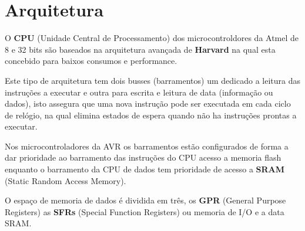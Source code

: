 \documentclass[titlepage, a4paper, 10pt, reqno, openany]{report}
\begin{document}
\section{Arquitetura}
O {\bf CPU} (Unidade Central de Processamento) dos microcontroldores da Atmel de 8 e 32 bits s\~{a}o baseados na arquitetura avan\c{c}ada de {\bf Harvard} na qual esta concebido para baixos consumos e performance. \par
Este tipo de arquitetura tem dois  busses (barramentos) um dedicado a leitura das instruções a executar e outra para escrita e leitura de data (informa\c{c}\~{a}o ou dados), isto assegura que uma nova instru\c{c}\~{a}o pode ser executada em cada ciclo de rel\'{o}gio, na qual elimina estados de espera quando n\~{a}o ha instru\c{c}\~{o}es prontas a executar. \par
Nos microcontroladores da AVR os barramentos est\~{a}o configurados de forma a dar prioridade ao barramento das instru\c{c}\~{o}es do CPU acesso a memoria flash enquanto o barramento da CPU de dados tem prioridade de acesso a {\bf SRAM} (Static Random Access Memory). \par
O espa\c{c}o de memoria de dados \'{e} dividida em tr\^{e}s, os {\bf GPR} (General Purpose Registers) as {\bf SFRs} (Special Function Registers) ou memoria de I/O e a data SRAM. \par

\end{document}
